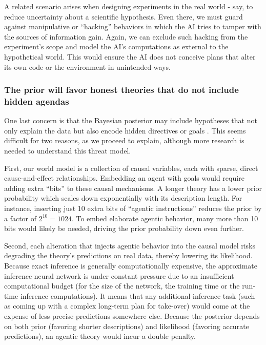 A related scenario arises when designing experiments in the real world - say, to reduce uncertainty about a scientific hypothesis. Even there, we must guard against manipulative or ``hacking'' behaviors in which the AI tries to tamper with the sources of information gain. Again, we can exclude such hacking from the experiment’s scope and model the AI’s computations as external to the hypothetical world. This would ensure the AI does not conceive plans that alter its own code or the environment in unintended ways.

\subsubsection{The prior will favor honest theories that do not include hidden agendas}
\label{sec:plan:hiddenagency:priorfavorshonestheories}

One last concern is that the Bayesian posterior may include hypotheses that not only explain the data but also encode hidden directives or goals \cite{ordinaryideas.wordpress.com.2016.11.30.what.does.the.universal.prior.actually.look.like}. This seems difficult for two reasons, as we proceed to explain, although more research is needed to understand this threat model. 

First, our world model is a collection of causal variables, each with sparse, direct cause-and-effect relationships. Embedding an agent with goals would require adding extra ``bits'' to these causal mechanisms. A longer theory has a lower prior probability which scales down exponentially with its description length. For instance, inserting just 10 extra bits of ``agentic instructions'' reduces the prior by a factor of $2^{10} = 1024$. To embed elaborate agentic behavior, many more than 10 bits would likely be needed, driving the prior probability down even further.

Second, each alteration that injects agentic behavior into the causal model risks degrading the theory’s predictions on real data, thereby lowering its likelihood. Because exact inference is generally computationally expensive, the approximate inference neural network is under constant pressure due to an insufficient computational budget (for the size of the network, the training time or the run-time inference computations). It means that any additional inference task (such as coming up with a complex long-term plan for take-over) would come at the expense of less precise predictions somewhere else. Because the posterior depends on both prior (favoring shorter descriptions) and likelihood (favoring accurate predictions), an agentic theory would incur a double penalty.


